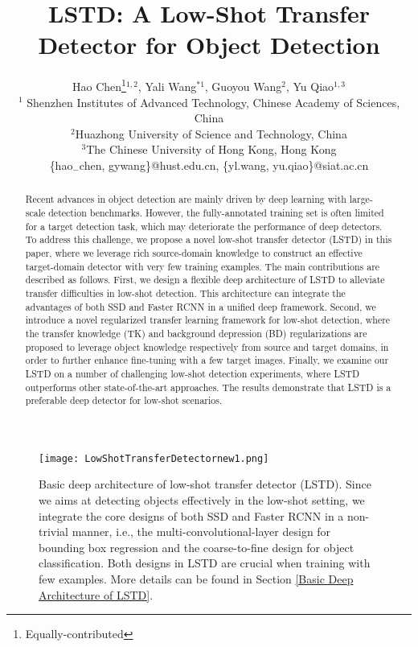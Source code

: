 \documentclass[letterpaper]{article} \usepackage{aaai18}  \usepackage{times}  \usepackage{helvet}  \usepackage{courier}  \usepackage{url}  \usepackage{graphicx}
\begin{document}
\title{LSTD: A Low-Shot Transfer Detector for Object Detection}
\author{Hao Chen\thanks{Equally-contributed}$^{1,2}$, Yali Wang$^{*1}$, Guoyou Wang$^{2}$, Yu Qiao$^{1, 3}$\\
$^{1}$
Shenzhen Institutes of Advanced Technology, Chinese Academy of Sciences, China\\
$^{2}$Huazhong University of Science and Technology, China\\
$^{3}$The Chinese University of Hong Kong, Hong Kong\\
\{hao$_{-}$chen, gywang\}@hust.edu.cn, \{yl.wang, yu.qiao\}@siat.ac.cn\\}
\maketitle


\begin{abstract}
Recent advances in object detection are mainly driven by deep learning with large-scale detection benchmarks.
However,
the fully-annotated training set is often limited for a target detection task,
which may deteriorate the performance of deep detectors.
To address this challenge,
we propose a novel low-shot transfer detector (LSTD) in this paper,
where we leverage rich source-domain knowledge to construct an effective target-domain detector with very few training examples.
The main contributions are described as follows.
First,
we design a flexible deep architecture of LSTD to alleviate transfer difficulties in low-shot detection.
This architecture can integrate the advantages of both SSD and Faster RCNN in a unified deep framework.
Second,
we introduce a novel regularized transfer learning framework for low-shot detection,
where
the transfer knowledge (TK) and background depression (BD) regularizations are proposed to leverage object knowledge respectively from source and target domains,
in order to further enhance fine-tuning with a few target images.
Finally,
we examine our LSTD on a number of challenging low-shot detection experiments,
where
LSTD outperforms other state-of-the-art approaches.
The results demonstrate that LSTD is a preferable deep detector for low-shot scenarios.
\end{abstract}


\begin{figure*}[t]
\centering
\texttt{[image: LowShotTransferDetectornew1.png]}
\caption{Basic deep architecture of low-shot transfer detector (LSTD).
Since we aims at detecting objects effectively in the low-shot setting,
we integrate the core designs of both SSD \cite{Liueccv2016} and Faster RCNN \cite{Renpami2016} in a non-trivial manner,
i.e.,
the multi-convolutional-layer design for bounding box regression and the coarse-to-fine design for object classification.
Both designs in LSTD are crucial when training with few examples.
More details can be found in Section \ref{Basic Deep Architecture of LSTD}.}
\label{LSTD}
\end{figure*}
\end{document}
